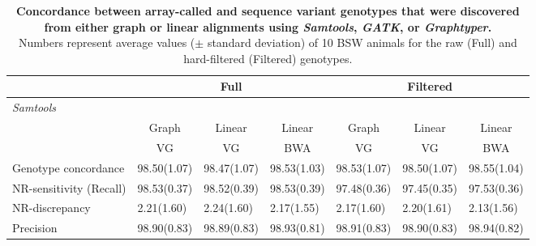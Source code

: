 \documentclass[../main.tex]{subfiles}
\begin{document}
\begin{flushleft}
\begin{landscape}
\begin{table}
    \centering
    \caption[Concordance between array-called and sequence variant genotypes]{\textbf{Concordance between array-called and sequence variant genotypes that were discovered from either graph or linear alignments using \emph{Samtools}, \emph{GATK}, or \emph{Graphtyper}.}\\ \small{Numbers represent average values ($\pm$ standard deviation) of 10 BSW animals for the raw (Full) and hard-filtered (Filtered) genotypes.}}
    \bigskip
    \label{sup_tab:s33}
    \begin{tabular}{|l|l|l|l|l|l|l|} 
    \hline
    ~                       & \multicolumn{3}{c|}{Full}                                                              & \multicolumn{3}{c|}{Filtered}                                                           \\ 
    \hline
    \multicolumn{7}{|l|}{\textit{Samtools}}                                                                                                                                                                    \\ 
    \hline
    \multirow{2}{*}{~}      & \multicolumn{1}{c|}{Graph} & \multicolumn{1}{c|}{Linear} & \multicolumn{1}{c|}{Linear} & \multicolumn{1}{c|}{Graph} & \multicolumn{1}{c|}{Linear} & \multicolumn{1}{c|}{Linear}  \\ 
    \cline{2-7}
                            & \multicolumn{1}{c|}{VG}    & \multicolumn{1}{c|}{VG}     & \multicolumn{1}{c|}{BWA}    & \multicolumn{1}{c|}{VG}    & \multicolumn{1}{c|}{VG}     & \multicolumn{1}{c|}{BWA}     \\ 
    \hline
    Genotype concordance    & 98.50(1.07)                & 98.47(1.07)                 & 98.53(1.03)                 & 98.53(1.07)                & 98.50(1.07)                 & 98.55(1.04)                  \\ 
    \hline
    NR-sensitivity (Recall) & 98.53(0.37)                & 98.52(0.39)                 & 98.53(0.39)                 & 97.48(0.36)                & 97.45(0.35)                 & 97.53(0.36)                  \\ 
    \hline
    NR-discrepancy          & 2.21(1.60)                 & 2.24(1.60)                  & 2.17(1.55)                  & 2.17(1.60)                 & 2.20(1.61)                  & 2.13(1.56)                   \\ 
    \hline
    Precision               & 98.90(0.83)                & 98.89(0.83)                 & 98.93(0.81)                 & 98.91(0.83)                & 98.90(0.83)                 & 98.94(0.82)                  \\ 

\end{tabular}
\end{table}
\end{landscape}
\end{flushleft}
\end{document}
